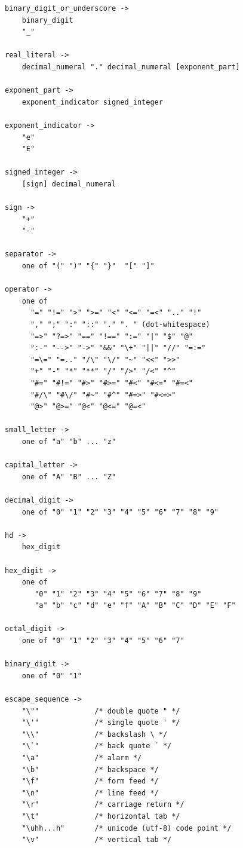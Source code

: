 \begin{scriptsize}
\begin{verbatim}
binary_digit_or_underscore ->
    binary_digit
    "_" 

real_literal ->
    decimal_numeral "." decimal_numeral [exponent_part] 

exponent_part ->
    exponent_indicator signed_integer

exponent_indicator ->
    "e" 
    "E"

signed_integer ->
    [sign] decimal_numeral

sign ->
    "+"
    "-"

separator ->
    one of "(" ")" "{" "}"  "[" "]"  

operator ->
    one of
      "=" "!=" ">" ">=" "<" "<=" "=<" ".." "!"
      "," ";" ":" "::" "." ". " (dot-whitespace)
      "=>" "?=>" "==" "!==" ":=" "|" "$" "@"
      ":-" "-->" "->" "&&" "\+" "||" "//" "=:=" 
      "=\=" "=.." "/\" "\/" "~" "<<" ">>"
      "+" "-" "*" "**" "/" "/>" "/<" "^" 
      "#=" "#!=" "#>" "#>=" "#<" "#<=" "#=<"
      "#/\" "#\/" "#~" "#^" "#=>" "#<=>"
      "@>" "@>=" "@<" "@<=" "@=<"

small_letter ->
    one of "a" "b" ... "z"

capital_letter ->
    one of "A" "B" ... "Z"

decimal_digit ->
    one of "0" "1" "2" "3" "4" "5" "6" "7" "8" "9"

hd ->
    hex_digit

hex_digit ->
    one of 
       "0" "1" "2" "3" "4" "5" "6" "7" "8" "9" 
       "a" "b" "c" "d" "e" "f" "A" "B" "C" "D" "E" "F"

octal_digit ->
    one of "0" "1" "2" "3" "4" "5" "6" "7"

binary_digit ->
    one of "0" "1" 

escape_sequence ->
    "\""             /* double quote " */
    "\'"             /* single quote ' */
    "\\"             /* backslash \ */
    "\`"             /* back quote ` */
    "\a"             /* alarm */
    "\b"             /* backspace */
    "\f"             /* form feed */
    "\n"             /* line feed */
    "\r"             /* carriage return */
    "\t"             /* horizontal tab */
    "\uhh...h"       /* unicode (utf-8) code point */
    "\v"             /* vertical tab */
\end{verbatim}
\end{scriptsize}
\ignore{

}
